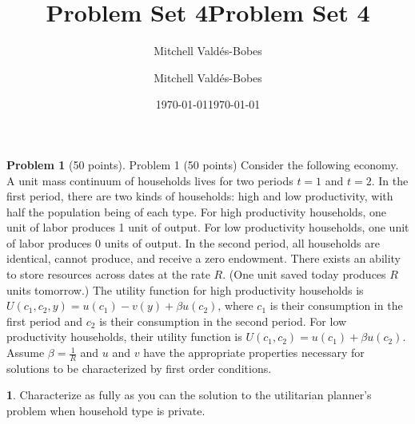 \documentclass[12pt]{article}
\title{Problem Set 4}
\author{Mitchell Valdés-Bobes}
\date{\today}
\title{Problem Set 4}
\author{Mitchell Valdés-Bobes}
\date{\today}
\theoremstyle{definition}
\newtheorem{problem}{Problem}
\newtheorem{subproblem}{}[problem]
\begin{document}
\maketitle

\begin{problem}[50 points] 
Problem 1 (50 points) Consider the following economy. A unit mass continuum of households lives for two periods $t=1$ and $t=2$. In the first period, there are two kinds of households: high and low productivity, with half the population being of each type. For high productivity households, one unit of labor produces 1 unit of output. For low productivity households, one unit of labor produces 0 units of output. In the second period, all households are identical, cannot produce, and receive a zero endowment. There exists an ability to store resources across dates at the rate ${R}$. (One unit saved today produces ${R}$ units tomorrow.) The utility function for high productivity households is ${U}\left({c}_{1}, {c}_{2}, {y}\right)={u}\left({c}_{1}\right)-v({y})+\beta {u}\left({c}_{2}\right)$, where ${c}_{1}$ is their consumption in the first period
and $c_{2}$ is their consumption in the second period. For low productivity households, their utility function is ${U}\left({c}_{1}, {c}_{2}\right)={u}\left({c}_{1}\right)+\beta {u}\left({c}_{2}\right) .$ Assume $\beta=\frac{1}{{R}}$ and ${u}$ and $v$ have the appropriate properties necessary for solutions to be characterized by first order conditions.

\end{problem}

\begin{subproblem}
Characterize as fully as you can the solution to the utilitarian planner's problem when household type is private.
\end{subproblem}
\end{document}
